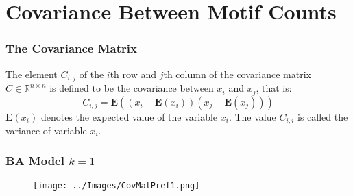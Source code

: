 \documentclass{beamer}
\begin{document}
        

    

    

    

\section{Covariance Between Motif Counts}
\begin{frame}
    \frametitle{The Covariance Matrix}
    
    \begin{definition}
        The element $C_{i,j}$ of the $i$th row and $j$th column of the covariance matrix $C \in \mathbb{R}^{n \times n}$
        is defined to be the covariance between $x_{i}$ and $x_j$, that is:
        $$
            C_{i,j} = \mathbf{E} ((x_i - \mathbf{E}(x_i))(x_j - \mathbf{E}(x_j)))
        $$
        $\mathbf{E}(x_i)$ denotes the expected value of the variable $x_i$. The value $C_{i,i}$ is called the variance of variable $x_i$.
        \label{def:cov}
    \end{definition}
\end{frame}
    

\begin{frame}
\frametitle{BA Model $k=1$}
\begin{figure}
    \texttt{[image: ../Images/CovMatPref1.png]}
    \centering
\end{figure}
\end{frame}
\end{document}
